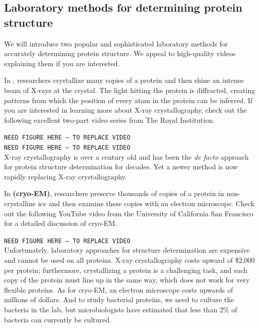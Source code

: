 \FloatBarrier
{}
\subsection{Laboratory methods for determining protein structure}

We will introduce two popular and sophisticated laboratory methods for accurately determining protein structure. We appeal to high-quality videos explaining them if you are interested.

In , researchers crystallize many copies of a protein and then shine an intense beam of X-rays at the crystal. The light hitting the protein is diffracted, creating patterns from which the position of every atom in the protein can be inferred. If you are interested in learning more about X-ray crystallography, check out the following excellent two-part video series from The Royal Institution.

\texttt{NEED FIGURE HERE -- TO REPLACE VIDEO}\\

\texttt{NEED FIGURE HERE -- TO REPLACE VIDEO}\\

X-ray crystallography is over a century old and has been the \textit{de facto} approach for protein structure determination for decades. Yet a newer method is now rapidly replacing X-ray crystallography.

In  \textbf{(cryo-EM)}, researchers preserve thousands of copies of a protein in non-crystalline ice and then examine these copies with an electron microscope. Check out the following YouTube video from the University of California San Francisco for a detailed discussion of cryo-EM.

\texttt{NEED FIGURE HERE -- TO REPLACE VIDEO}\\

Unfortunately, laboratory approaches for structure determination are expensive and cannot be used on all proteins. X-ray crystallography costs upward of \$2,000 per protein; furthermore, crystallizing a protein is a challenging task, and each copy of the protein must line up in the same way, which does not work for very flexible proteins. As for cryo-EM, an electron microscope costs upwards of millions of dollars. And to study bacterial proteins, we need to culture the bacteria in the lab, but microbiologists have estimated that less than 2\% of bacteria can currently be cultured.

